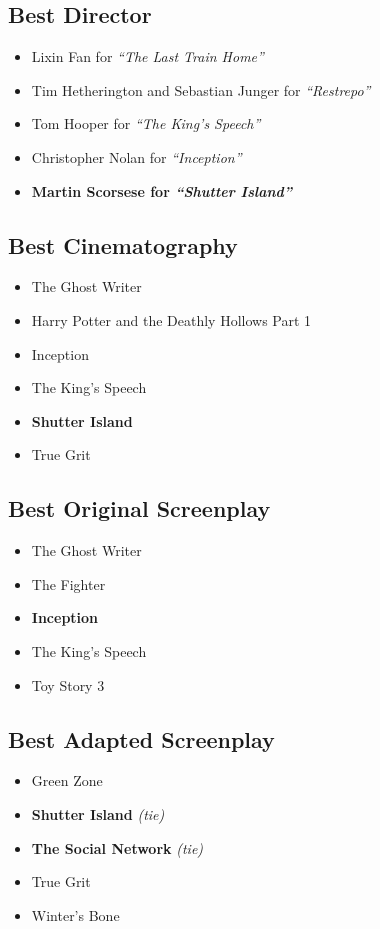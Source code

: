 \documentclass{article}
\begin{document}
\begin{multicols}{2}
\subsection*{Best Director}
  \begin{itemize}
    \setlength{\parskip}{0pt}
    \setlength{\itemsep}{0pt}
    \item[] Lixin Fan for \emph{``The Last Train Home''}
    \item[] Tim Hetherington and Sebastian Junger for \emph{``Restrepo''}
    \item[] Tom Hooper for \emph{``The King's Speech''}
    \item[] Christopher Nolan for \emph{``Inception''}
    \item \textbf{Martin Scorsese for \emph{``Shutter Island''}}
  \end{itemize}

\subsection*{Best Cinematography}
  \begin{itemize}
    \setlength{\parskip}{0pt}
    \setlength{\itemsep}{0pt}
    \item[] The Ghost Writer
    \item[] Harry Potter and the Deathly Hollows Part 1
    \item[] Inception
    \item[] The King's Speech
    \item \textbf{Shutter Island}
    \item[] True Grit
  \end{itemize}

\subsection*{Best Original Screenplay}
  \begin{itemize}
    \setlength{\parskip}{0pt}
    \setlength{\itemsep}{0pt}
    \item[] The Ghost Writer
    \item[] The Fighter
    \item \textbf{Inception}
    \item[] The King's Speech
    \item[] Toy Story 3
  \end{itemize}

\subsection*{Best Adapted Screenplay}
  \begin{itemize}
    \setlength{\parskip}{0pt}
    \setlength{\itemsep}{0pt}
    \item[] Green Zone
    \item \textbf{Shutter Island} \emph{(tie)}
    \item \textbf{The Social Network} \emph{(tie)}
    \item[] True Grit
    \item[] Winter's Bone
  \end{itemize}


\end{multicols}
\end{document}
